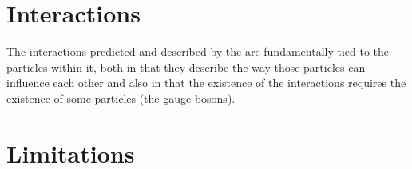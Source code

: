 
\section{Interactions}
\label{sec:interactions}

The interactions predicted and described by the \SM are fundamentally tied to the particles within it, both in that they describe the way those particles can influence each other and also in that the existence of the interactions requires the existence of some particles (the gauge bosons). 


\section{Limitations}
\label{sec:limitations}

